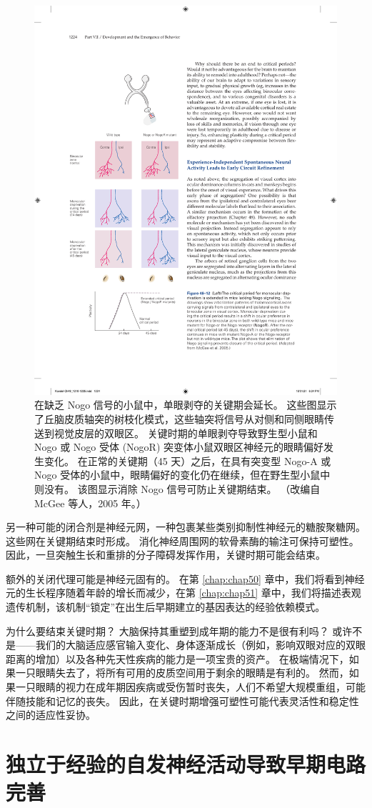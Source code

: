 \begin{figure}[htbp]
	\centering
	\includegraphics[width=0.5\linewidth]{chap49/fig_49_12}
	\caption{在缺乏 Nogo 信号的小鼠中，单眼剥夺的关键期会延长。 这些图显示了丘脑皮质轴突的树枝化模式，这些轴突将信号从对侧和同侧眼睛传送到视觉皮层的双眼区。 关键时期的单眼剥夺导致野生型小鼠和 Nogo 或 Nogo 受体 (NogoR) 突变体小鼠双眼区神经元的眼睛偏好发生变化。 在正常的关键期（45 天）之后，在具有突变型 Nogo-A 或 Nogo 受体的小鼠中，眼睛偏好的变化仍在继续，但在野生型小鼠中则没有。 该图显示消除 Nogo 信号可防止关键期结束。 （改编自 McGee 等人，2005 年。）}
	\label{fig:49_12}
\end{figure}

另一种可能的闭合剂是神经元网，一种包裹某些类别抑制性神经元的糖胺聚糖网。
这些网在关键期结束时形成。
消化神经周围网的软骨素酶的输注可保持可塑性。
因此，一旦突触生长和重排的分子障碍发挥作用，关键时期可能会结束。


额外的关闭代理可能是神经元固有的。
在第 \ref{chap:chap50} 章中，我们将看到神经元的生长程序随着年龄的增长而减少，在第 \ref{chap:chap51} 章中，我们将描述表观遗传机制，该机制“锁定”在出生后早期建立的基因表达的经验依赖模式。


为什么要结束关键时期？
大脑保持其重塑到成年期的能力不是很有利吗？
或许不是——我们的大脑适应感官输入变化、身体逐渐成长（例如，影响双眼对应的双眼距离的增加）以及各种先天性疾病的能力是一项宝贵的资产。
在极端情况下，如果一只眼睛失去了，将所有可用的皮质空间用于剩余的眼睛是有利的。
然而，如果一只眼睛的视力在成年期因疾病或受伤暂时丧失，人们不希望大规模重组，可能伴随技能和记忆的丧失。
因此，在关键时期增强可塑性可能代表灵活性和稳定性之间的适应性妥协。



\section{独立于经验的自发神经活动导致早期电路完善}

